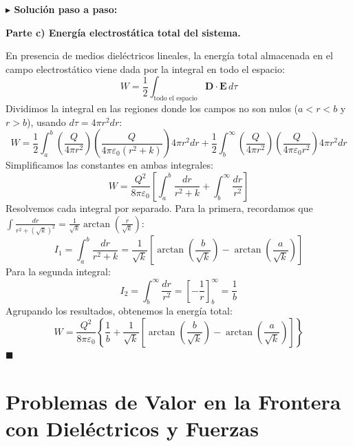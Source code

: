 \documentclass[11pt,a4paper]{book}
\newenvironment{solucion}{%
    \par\medskip\noindent\textbf{\color{blue!65!black}\Large $\blacktriangleright$ Solución paso a paso:}\par\medskip
}{%
    \hfill$\blacksquare$\par\bigskip
}
\newcommand{\Evec}{\bm{E}}
\newcommand{\Dvec}{\bm{D}}
\begin{document}
\begin{solucion}
\medskip
\textbf{Parte c) Energía electrostática total del sistema.}

En presencia de medios dieléctricos lineales, la energía total almacenada en el campo electrostático viene dada por la integral en todo el espacio:
\begin{equation}
    W = \frac{1}{2} \int_{\text{todo el espacio}} \Dvec \cdot \Evec \, d\tau
\end{equation}
Dividimos la integral en las regiones donde los campos no son nulos ($a < r < b$ y $r > b$), usando $d\tau = 4\pi r^2 dr$:
\begin{equation}
    W = \frac{1}{2} \int_{a}^{b} \left(\frac{Q}{4\pi r^2}\right)\left(\frac{Q}{4\pi\varepsilon_0(r^2+k)}\right) 4\pi r^2 dr + \frac{1}{2} \int_{b}^{\infty} \left(\frac{Q}{4\pi r^2}\right)\left(\frac{Q}{4\pi\varepsilon_0 r^2}\right) 4\pi r^2 dr
\end{equation}
Simplificamos las constantes en ambas integrales:
\begin{equation}
    W = \frac{Q^2}{8\pi\varepsilon_0} \left[ \int_{a}^{b} \frac{dr}{r^2 + k} + \int_{b}^{\infty} \frac{dr}{r^2} \right]
\end{equation}
Resolvemos cada integral por separado. Para la primera, recordamos que $\int \frac{dr}{r^2 + (\sqrt{k})^2} = \frac{1}{\sqrt{k}}\arctan\left(\frac{r}{\sqrt{k}}\right)$:
\begin{equation}
    I_1 = \int_{a}^{b} \frac{dr}{r^2 + k} = \frac{1}{\sqrt{k}}\left[ \arctan\left(\frac{b}{\sqrt{k}}\right) - \arctan\left(\frac{a}{\sqrt{k}}\right) \right]
\end{equation}
Para la segunda integral:
\begin{equation}
    I_2 = \int_{b}^{\infty} \frac{dr}{r^2} = \left[ -\frac{1}{r} \right]_{b}^{\infty} = \frac{1}{b}
\end{equation}
Agrupando los resultados, obtenemos la energía total:
\begin{equation}
    W = \frac{Q^2}{8\pi\varepsilon_0} \left\{ \frac{1}{b} + \frac{1}{\sqrt{k}}\left[ \arctan\left(\frac{b}{\sqrt{k}}\right) - \arctan\left(\frac{a}{\sqrt{k}}\right) \right] \right\}
\end{equation}
\end{solucion}

\section[Problemas de frontera con dieléctricos]{Problemas de Valor en la Frontera con Dieléctricos y Fuerzas}
\end{document}
